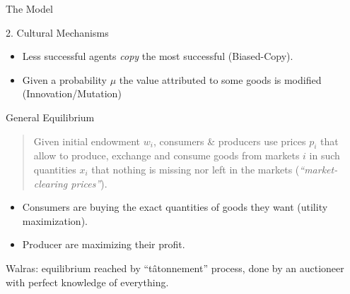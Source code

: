 \documentclass[12pt, notes=show]{beamer}
\begin{document}
	\begin{frame}{The Model}
		\begin{block}{2. Cultural Mechanisms}
			\begin{itemize}
					\vfill
				\item Less successful agents \emph{copy} the most successful (Biased-Copy).
					\vfill
				\item Given a probability $\mu$ the value attributed to some goods is modified (Innovation/Mutation)
			\end{itemize}
		\end{block}
	\end{frame}
	\begin{frame}{General Equilibrium}
	    \begin{quotation}
		\footnotesize
		Given initial endowment $w_i$, consumers \& producers use prices $p_i$ that allow to produce, exchange and consume goods from markets $i$ in such quantities $x_i$ that nothing is missing nor left in the markets (\emph{``market-clearing prices''}). 
	    \end{quotation}
	    \begin{itemize}
		\item  Consumers are buying the exact quantities of goods they want (utility maximization). 
		\item  Producer are maximizing their profit.
	    \end{itemize}

	    Walras: equilibrium reached by ``tâtonnement'' process, done by an auctioneer with perfect knowledge of everything.

	\end{frame}
\end{document}
